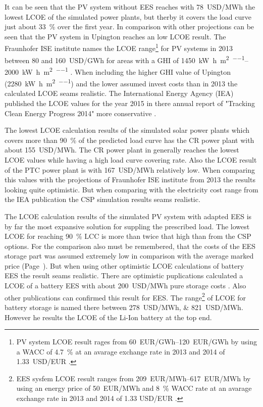 It can be seen that the PV system without EES reaches with \SI{78}{USD/MWh} the lowest LCOE of the simulated power plants, but therby it covers the load curve just about \SI{33}{\percent} over the first year. In comparison with other projections can be seen that the PV system in Upington reaches an low LCOE result. The Fraunhofer ISE institute names the LCOE range\footnote{PV system LCOE result rages from \SIrange{60}{120}{EUR/GWh} by using a WACC of \SI{4.7}{\percent}  \cite{FraunhoferISE2013} at an avarage exchange rate in 2013 and 2014 of \SI{1.33}{USD/EUR} \cite{StatistaGmbH2015}.} for PV systems in 2013 between 80 and \SI{160}{USD/GWh} for areas with a GHI of \SIrange{1450}{2000}{\kilo\watt\hour\per\square\metre\per\year} \cite{FraunhoferISE2013}. When including the higher GHI value of Upington (\SI{2280}{\kilo\watt\hour\per\square\metre\per\year}) and the lower assumed invest costs than in 2013 the calculated LCOE seams realistic. The International Energy Agency (IEA) published the LCOE values for the year 2015 in there annual report of "Tracking Clean Energy Progress 2014" more conservative \cite{IEA2014c}.

The lowest LCOE calculation results of the simulated solar power plants which covers more than \SI{90}{\percent} of the predicted load curve has the CR power plant with about \SI{155}{USD/MWh}. The CR power plant in generally reaches the lowest LCOE values while having a high load curve covering rate. Also the LCOE result of the PTC power plant is with \SI{167}{USD/MWh} relatively low. When comparing this values with the projections of Fraunhofer ISE institute from 2013 the results looking quite optimistic. But when comparing with the electricity cost range from the IEA publication the CSP simulation results seams realistic.

The LCOE calculation results of the simulated PV system with adapted EES is by far the most expansive solution for suppling the prescribed load. The lowest LCOE for reaching \SI{90}{\percent} LCC is more than twice that high than from the CSP options. For the comparison also must be remembered, that the costs of the EES storage part was assumed extremely low in comparison with the average marked price (Page~\pageref{SUBSUBPVFinancialparameter}). But when using other optimistic LCOE calculations of battery EES the result seams realistic. There are optimistic puplications calculated a LCOE of a battery EES with about \SI{200}{USD/MWh} pure storage costs \cite{Corcuera2015}. Also other publications can confirmed this result for EES. The range\footnote{EES sysfem LCOE result ranges from \SIrange{209}{617}{EUR/MWh} by using an energy price of \SI{50}{EUR/MWh} and \SI{8}{\percent} WACC rate \cite{Zakeri2015} at an avarage exchange rate in 2013 and 2014 of 1.33 USD/EUR \cite{StatistaGmbH2015}.} of LCOE for battery storage is named there between \SIlist{278;821}{USD/MWh}. However he results the LCOE of the Li-Ion battery at the top end.

